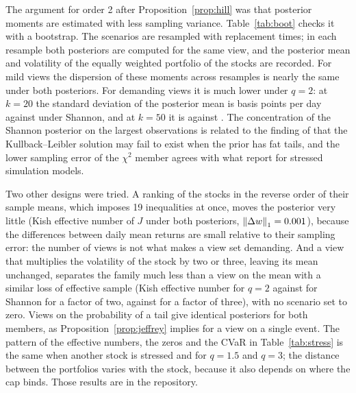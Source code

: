 \documentclass[11pt]{article}
\newcommand{\norm}[1]{\left\lVert #1 \right\rVert}
\begin{document}
The argument for order 2 after Proposition~\ref{prop:hill} was that
posterior moments are estimated with less sampling variance.
Table~\ref{tab:boot} checks it with a bootstrap. The scenarios are
resampled with replacement \nBootReps{} times; in each resample both posteriors are computed for the
same view, and the posterior mean and volatility of the equally weighted
portfolio of the \nN{} stocks are recorded. For mild views the dispersion
of these moments across resamples is nearly the same under both posteriors. For
demanding views it is much lower under $q=2$: at $k=20$ the standard
deviation of the posterior mean is \nBootSdTTwenty{} basis points per day
against \nBootSdSTwenty{} under Shannon, and at $k=50$ it is
\nBootSdTFifty{} against \nBootSdSFifty. The concentration of the Shannon
posterior on the largest observations is related to the finding of
\citet{DeyJuneja2012} that the Kullback--Leibler solution may fail to
exist when the prior has fat tails, and the lower sampling error of the
$\chi^2$ member agrees with what \citet{MakamMillossovichTsanakas2021}
report for stressed simulation models.

\begin{table}[t]
\centering
\small
\caption{Sampling variability of posterior moments in the stress
experiment. Standard deviation, across \nBootReps{} bootstrap resamples of
the scenarios, of the posterior mean of the equally weighted portfolio
(basis points per day), and coefficient of variation of its posterior
volatility, for the view of Table~\ref{tab:stress} at each $k$.}
\label{tab:boot}

\end{table}

Two other designs were tried. A ranking of the \nN{} stocks in
the reverse order of their sample means, which imposes 19 inequalities at
once, moves the posterior very little (Kish effective number \nRankEss{} of $J$
under both posteriors, $\norm{\Delta w}_1 = \nRankDw$), because the differences
between daily mean returns are small relative to their sampling error: the
number of views is not what makes a view set demanding. And a view that
multiplies the volatility of the stock by two or three, leaving its mean
unchanged, separates the family much less than a view on the mean with a
similar loss of effective sample (Kish effective number \nVolKishTTwo{} for $q=2$
against \nVolKishSTwo{} for Shannon for a factor of two, \nVolKishTThree{} against
\nVolKishSThree{} for a factor of three), with no scenario set to zero.
Views on the probability of a tail give identical posteriors for both
members, as Proposition~\ref{prop:jeffrey} implies for a view on a single
event. The pattern of the effective numbers, the zeros and the CVaR in
Table~\ref{tab:stress} is the same when another stock is stressed and for
$q = 1.5$ and $q = 3$; the distance between the portfolios varies with the
stock, because it also depends on where the cap binds. Those results are in
the repository.
\end{document}
